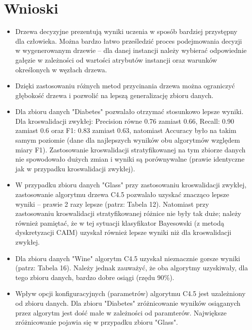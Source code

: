 \pagebreak

\section{Wnioski}
\begin{itemize}
  \item{Drzewa decyzyjne prezentują wyniki uczenia w sposób bardziej przystępny dla człowieka. 
        Można bardzo łatwo prześledzić proces podejmowania decyzji w wygenerowanym drzewie -- dla danej
        instancji należy wybierać odpowiednie gałęzie w zależności od wartości atrybutów instancji oraz
        warunków określonych w węzłach drzewa.}
  \item{Dzięki zastosowaniu różnych metod przycinania drzewa można ograniczyć głębokość drzewa i 
        pozwolić na lepszą generalizację zbioru danych.}
  \item{Dla zbioru danych "Diabetes" pozwalało otrzymać stosunkowo lepsze wyniki. Dla kroswalidacji zwykłej: 
    Precision równe 0.76 zamiast 0.66, Recall: 0.90 zamiast 0.6 oraz F1: 0.83 zamiast 0.63, natomiast Accuracy 
    było na takim samym poziomie (dane dla najlepszych wyników obu algorytmów względem miary F1). Zastosowanie
    kroswalidacji stratyfikowanej na tym zbiorze danych nie spowodowało dużych zmian i wyniki są porównywalne
    (prawie identyczne jak w przypadku kroswalidacji zwykłej).}
  \item{W przypadku zbioru danych "Glass" przy zastosowaniu kroswalidacji zwykłej, zastosowanie algorytmu
        drzewa C4.5 pozwalało uzyskać znacząco lepsze wyniki -- prawie 2 razy lepsze (patrz: Tabela 12).
        Natomiast przy zastosowaniu kroswalidacji stratyfikowanej różnice nie były tak duże; należy również pamiętać,
        że w tej sytuacji klasyfikator Bayesowski (z metodą dyskretyzacji CAIM) uzyskał również lepsze wyniki
        niż dla kroswalidacji zwykłej.}
  \item{Dla zbioru danych "Wine" algorytm C4.5 uzyskał nieznacznie gorsze wyniki (patrz: Tabela 16). Należy jednak
       zauważyć, że oba algorytmy uzyskiwały, dla tego zbioru danych, bardzo dobre osiągi (rzędu 90\%).} 
  \item{Wpływ opcji konfiguracyjnych (parametrów) algorytmu C4.5 jest uzależniony od zbioru danych. Dla zbioru
    "Diabetes" zróżnicowanie wyników osiąganych przez algorytm jest dość małe w zależności od paramterów.
    Największe zróżnicowanie pojawia się w przypadku zbioru "Glass".}

\end{itemize}
